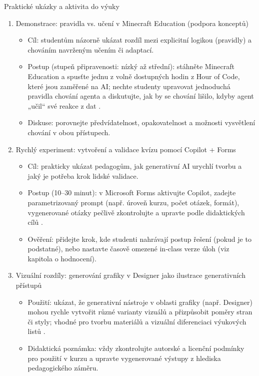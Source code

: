 Praktické ukázky a aktivita do výuky
\begin{enumerate}
  \item Demonstrace: pravidla vs. učení v Minecraft Education (podpora konceptů)
    \begin{itemize}
      \item Cíl: studentům názorně ukázat rozdíl mezi explicitní logikou (pravidly) a chováním navrženým učením či adaptací.
      \item Postup (stupeň připravenosti: nízký až střední): stáhněte Minecraft Education a spusťte jednu z volně dostupných hodin z Hour of Code, které jsou zaměřené na AI; nechte studenty upravovat jednoduchá pravidla chování agenta a diskutujte, jak by se chování lišilo, kdyby agent „učil“ své reakce z dat \cite{kb_ai_101_tipu_pdf_04e4a115_page_15_2}.
      \item Diskuse: porovnejte předvídatelnost, opakovatelnost a možnosti vysvětlení chování v obou přístupech.
    \end{itemize}

  \item Rychlý experiment: vytvoření a validace kvízu pomocí Copilot + Forms
    \begin{itemize}
      \item Cíl: prakticky ukázat pedagogům, jak generativní AI urychlí tvorbu a jaký je potřeba krok lidské validace.
      \item Postup (10–30 minut): v Microsoft Forms aktivujte Copilot, zadejte parametrizovaný prompt (např. úroveň kurzu, počet otázek, formát), vygenerované otázky pečlivě zkontrolujte a upravte podle didaktických cílů \cite{kb_ai_101_tipu_pdf_04e4a115_page_8_1}.
      \item Ověření: přidejte krok, kde studenti nahrávají postup řešení (pokud je to podstatné), nebo nastavte časově omezené in‑class verze úloh (viz kapitola o hodnocení).
    \end{itemize}

  \item Vizuální rozdíly: generování grafiky v Designer jako ilustrace generativních přístupů
    \begin{itemize}
      \item Použití: ukázat, že generativní nástroje v oblasti grafiky (např. Designer) mohou rychle vytvořit různé varianty vizuálů a přizpůsobit poměry stran či styly; vhodné pro tvorbu materiálů a vizuální diferenciaci výukových listů \cite{kb_ai_101_tipu_pdf_04e4a115_page_51_1}.
      \item Didaktická poznámka: vždy zkontrolujte autorské a licenční podmínky pro použití v kurzu a upravte vygenerované výstupy z hlediska pedagogického záměru.
    \end{itemize}
\end{enumerate}

